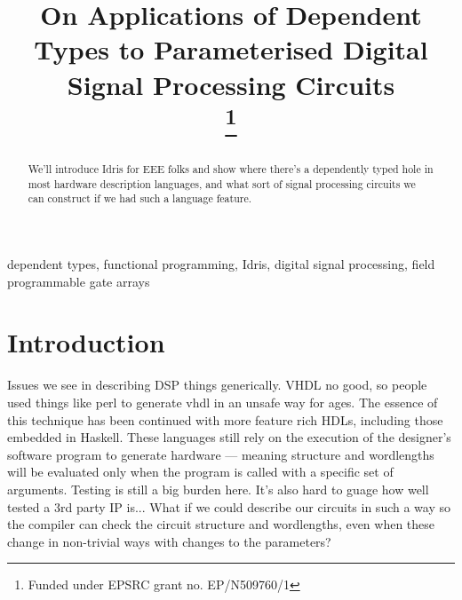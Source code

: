 \documentclass[conference]{IEEEtran}
\begin{document}
\title{On Applications of Dependent Types to Parameterised Digital Signal
  Processing Circuits \\
\thanks{Funded under EPSRC grant no. EP/N509760/1} }

\author{
\and
{}
\and
{}
}

\maketitle

\begin{abstract}
  We'll introduce Idris for EEE folks and show where there's a dependently typed
  hole in most hardware description languages, and what sort of signal
  processing circuits we can construct if we had such a language feature.
\end{abstract}

\begin{IEEEkeywords}
dependent types, functional programming, Idris, digital signal processing, field programmable gate arrays  
\end{IEEEkeywords}

\section{Introduction}

Issues we see in describing DSP things generically. VHDL no good, so people used
things like perl to generate vhdl in an unsafe way for ages. The essence of this
technique has been continued with more feature rich HDLs, including those
embedded in Haskell. These languages still rely on the execution of the
designer's software program to generate hardware --- meaning structure and
wordlengths will be evaluated only when the program is called with a specific
set of arguments. Testing is still a big burden here. It's also hard to guage
how well tested a 3rd party IP is... What if we could describe our circuits in
such a way so the compiler can check the circuit structure and wordlengths, even
when these change in non-trivial ways with changes to the parameters?
\end{document}
